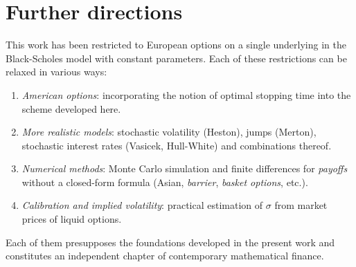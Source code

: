 \documentclass[11pt,a4paper,oneside]{report}
\theoremstyle{plain}
\theoremstyle{definition}
\theoremstyle{remark}
\newcommand{\1}{\mathbf{1}}
\begin{document}
\section{Further directions}
\label{sec:lineas_continuacion}

This work has been restricted to European options on a single
underlying in the Black-Scholes model with constant parameters. Each
of these restrictions can be relaxed in various ways:

\begin{enumerate}[leftmargin=*]
  \item \emph{American options}: incorporating the notion of optimal
        stopping time into the scheme developed here.
  \item \emph{More realistic models}: stochastic volatility (Heston),
        jumps (Merton), stochastic interest rates (Vasicek,
        Hull-White) and combinations thereof.
  \item \emph{Numerical methods}: Monte Carlo simulation and finite
        differences for \emph{payoffs} without a closed-form formula
        (Asian, \emph{barrier}, \emph{basket options}, etc.).
  \item \emph{Calibration and implied volatility}: practical
        estimation of $\sigma$ from market prices of liquid options.
\end{enumerate}

Each of them presupposes the foundations developed in the present
work and constitutes an independent chapter of contemporary
mathematical finance.
\end{document}
